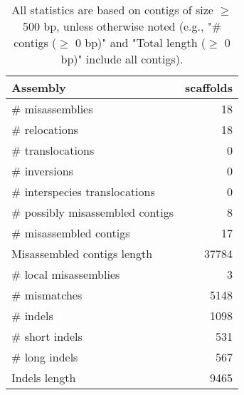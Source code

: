 \documentclass[12pt,a4paper]{article}
\begin{document}
\begin{table}[ht]
\begin{center}
\caption{All statistics are based on contigs of size $\geq$ 500 bp, unless otherwise noted (e.g., "\# contigs ($\geq$ 0 bp)" and "Total length ($\geq$ 0 bp)" include all contigs).}
\begin{tabular}{|l*{1}{|r}|}
\hline
Assembly & scaffolds \\ \hline
\# misassemblies & 18 \\ \hline
\hspace{5mm}\# relocations & 18 \\ \hline
\hspace{5mm}\# translocations & 0 \\ \hline
\hspace{5mm}\# inversions & 0 \\ \hline
\hspace{5mm}\# interspecies translocations & 0 \\ \hline
\# possibly misassembled contigs & 8 \\ \hline
\# misassembled contigs & 17 \\ \hline
Misassembled contigs length & 37784 \\ \hline
\# local misassemblies & 3 \\ \hline
\# mismatches & 5148 \\ \hline
\# indels & 1098 \\ \hline
\hspace{5mm}\# short indels & 531 \\ \hline
\hspace{5mm}\# long indels & 567 \\ \hline
Indels length & 9465 \\ \hline
\end{tabular}
\end{center}
\end{table}
\end{document}
